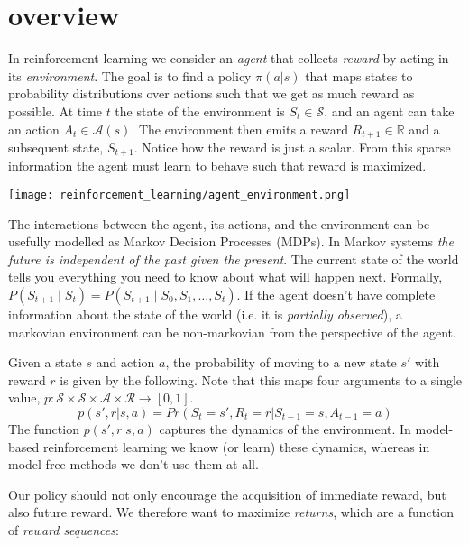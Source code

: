 \newpage

\section{overview}
In reinforcement learning we consider an \textit{agent} that collects \textit{reward} by acting in its \textit{environment}. The goal is to find a policy $\pi(a|s)$ that maps states to probability distributions over actions such that we get as much reward as possible. At time $t$ the state of the environment is $S_t \in \mathcal{S}$, and an agent can take an action $A_t \in \mathcal{A}(s)$. The environment then emits a reward $R_{t+1} \in \mathbb{R} $ and a subsequent state, $S_{t+1}$. Notice how the reward is just a scalar. From this sparse information the agent must learn to behave such that reward is maximized.

\begin{center}\texttt{[image: reinforcement\_learning/agent\_environment.png]}\end{center}

The interactions between the agent, its actions, and the environment can be usefully modelled as Markov Decision Processes (MDPs). In Markov systems \textit{the future is independent of the past given the present}. The current state of the world tells you everything you need to know about what will happen next. Formally, $P(S_{t+1} \mid S_t) = P(S_{t+1} \mid S_0, S_1, \dots, S_{t})$. If the agent doesn't have complete information about the state of the world (i.e. it is \textit{partially observed}), a markovian environment can be non-markovian from the perspective of the agent.

Given a state $s$ and action $a$, the probability of moving to a new state $s'$ with reward $r$ is given by the following. Note that this maps four arguments to a single value, $p : \mathcal{S} \times \mathcal{S} \times \mathcal{A} \times \mathcal{R} \rightarrow [0,1]$.
$$ p(s', r | s, a) = Pr(S_t=s', R_t=r | S_{t-1}=s, A_{t-1}=a) $$
The function $ p(s', r | s, a) $ captures the dynamics of the environment. In model-based reinforcement learning we know (or learn) these dynamics, whereas in model-free methods we don't use them at all.

Our policy should not only encourage the acquisition of immediate reward, but also future reward. We therefore want to maximize \textit{returns}, which are a function of \textit{reward sequences}:


